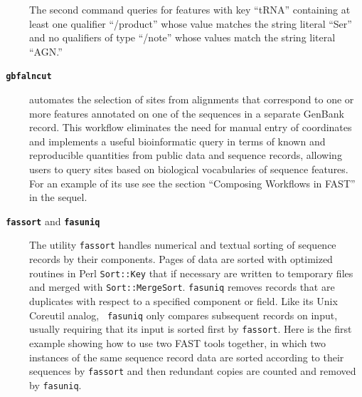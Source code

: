 \documentclass{frontiersSCNS} %
\begin{document}
\begin{description}
The second command queries for features with key ``tRNA'' containing
at least one qualifier ``/product'' whose value matches the string literal
``Ser'' and no qualifiers of type ``/note'' whose values match the
string literal ``AGN.''
\\
\item[\texttt{\textbf{  gbfalncut}} ] automates the selection of sites from
alignments that correspond to one or more features annotated on one of
the sequences in a separate GenBank record. This workflow eliminates
the need for manual entry of coordinates and implements a useful
bioinformatic query in terms of known and reproducible quantities from
public data and sequence records, allowing users to query sites based
on biological vocabularies of sequence features. For an example of its
use see the section ``Composing Workflows in FAST'' in the sequel.
\\
\item[\texttt{\textbf{ fassort}} and \texttt{\textbf{fasuniq}} ] The
  utility {\tt fassort} handles numerical and textual sorting of
  sequence records by their components. Pages of data are sorted with
  optimized routines in Perl {\tt Sort::Key} that if necessary are
  written to temporary files and merged with {\tt Sort::MergeSort}.
  {\tt fasuniq} removes records that are duplicates with respect to a
  specified component or field. Like its Unix Coreutil analog, {\tt
    fasuniq} only compares subsequent records on input, usually
  requiring that its input is sorted first by {\tt fassort}. Here is
  the first example showing how to use two FAST tools together, in
  which two instances of the same sequence record data are sorted
  according to their sequences by {\tt fassort} and then redundant
  copies are counted and removed by {\tt fasuniq}.


\end{description}
\end{document}
